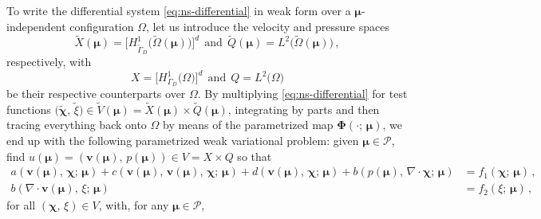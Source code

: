 \documentclass{elsarticle}
\numberwithin{equation}{section}
\theoremstyle{theorem}
\theoremstyle{definition}
\theoremstyle{remark}
\theoremstyle{proposition}
\numberwithin{figure}{section}
\newcommand{\wt}[1]{\widetilde{#1}}
\newcommand{\bg}[1]{\boldsymbol{#1}}
\begin{document}
		
		To write the differential system \eqref{eq:ns-differential} in weak form over a $\bg{\mu}$-independent configuration $\Omega$, let us introduce the velocity and pressure spaces \[ \wt{X}(\bg{\mu}) = \big[ H^1_{\wt{\Gamma}_D} \big( \wt{\Omega}(\bg{\mu}) \big) \big]^d ~~ \text{and} ~~ \wt{Q}(\bg{\mu}) = L^2 \big( \wt{\Omega}(\bg{\mu}) \big) \, , \] respectively, with \[ X = \big[ H^1_{\Gamma_D} \big( \Omega \big) \big]^d ~~ \text{and} ~~ Q = L^2 \big( \Omega \big) \] be their respective counterparts over $\Omega$. By multiplying \eqref{eq:ns-differential} for test functions $\big( \wt{\bg{\chi}}, \, \wt{\xi} \big) \in \wt{V}(\bg{\mu}) = \wt{X}(\bg{\mu}) \times \wt{Q}(\bg{\mu})$, integrating by parts and then tracing everything back onto $\Omega$ by means of the parametrized map $\bg{\Phi}(\cdot; \, \bg{\mu})$, we end up with the following parametrized weak variational problem: given $\bg{\mu} \in \mathcal{P}$, find $u(\bg{\mu}) = (\bg{v}(\bg{\mu}), \, p(\bg{\mu})) \in V = X \times Q$ so that
		\begin{equation*}
			\label{eq:ns-weak-reference}
			\begin{aligned}
				a(\bg{v}(\bg{\mu}), \, \bg{\chi}; \, \bg{\mu}) + c(\bg{v}(\bg{\mu}), \, \bg{v}(\bg{\mu}), \, \bg{\chi}; \, \bg{\mu}) + d(\bg{v}(\bg{\mu}), \, \bg{\chi}; \, \bg{\mu}) + b(p(\bg{\mu}), \, \nabla \cdot \bg{\chi}; \, \bg{\mu}) & = f_1(\bg{\chi}; \, \bg{\mu}) \, , \\
				b(\nabla \cdot \bg{v}(\bg{\mu}), \, \xi; \, \bg{\mu}) & = f_2(\xi; \, \bg{\mu}) \, ,
			\end{aligned}
		\end{equation*}
		for all $(\bg{\chi}, \, \xi) \in V$, with, for any $\bg{\mu} \in \mathcal{P}$,	
\end{document}

